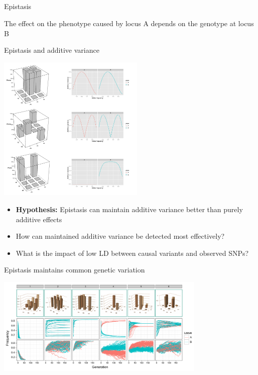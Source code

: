 \documentclass{beamer}
\begin{document}
\subsection{}

\begin{frame}{Epistasis}
\begin{definition}
{\color{orange} The effect on the phenotype caused by locus A depends on the genotype at locus B }
\end{definition}
\end{frame}

\begin{frame}{Epistasis and additive variance}
\begin{center}
\includegraphics[height=7cm]{gp_va}
\end{center}
\end{frame}

\begin{frame}{}
\begin{itemize}
\item \textbf{Hypothesis:} Epistasis can maintain additive variance better than purely additive effects
\item How can maintained additive variance be detected most effectively?
\item What is the impact of low LD between causal variants and observed SNPs?
\end{itemize}
\end{frame}


\begin{frame}{Epistasis maintains common genetic variation}
\begin{center}
\includegraphics[width=10cm]{maps_freqs}
\end{center}
\end{frame}
\end{document}
